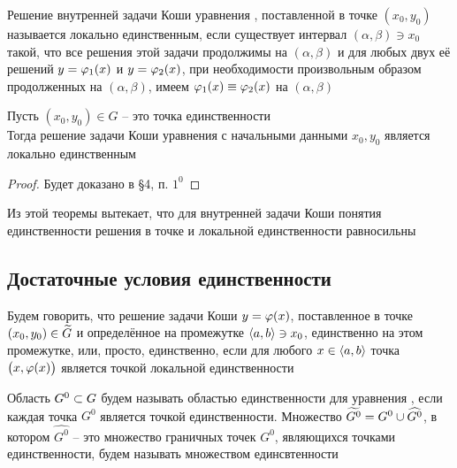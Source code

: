 \begin{definition}\label{def:uniq:local}
    Решение внутренней задачи Коши уравнения , поставленной в точке $ (x_0, y_0) $ называется локально единственным, если существует интервал $ (\alpha, \beta) \ni x_0 $ такой, что все решения этой задачи продолжимы на $ (\alpha, \beta) $ и для любых двух её решений $ y = \varphi_1(x) $ и $ y = \varphi_2(x) $, при необходимости произвольным образом продолженных на $ (\alpha, \beta) $, имеем $ \vphi_1(x) \equiv \vphi_2(x) $ на $ (\alpha, \beta) $
\end{definition}

\begin{theorem}\label{th:uniq-and-local-uniq}
	Пусть $ (x_0, y_0) \in G $ -- это точка единственности \\
    Тогда решение задачи Коши уравнения  с начальными данными $ x_0, y_0 $ является локально единственным
\end{theorem}

\begin{proof}
	Будет доказано в \S4, п. $ 1^0 $
\end{proof}

\begin{implication}
	Из этой теоремы вытекает, что для внутренней задачи Коши понятия единственности решения в точке и локальной единственности равносильны
\end{implication}

\subsection{Достаточные условия единственности}

\begin{definition}
    Будем говорить, что решение задачи Коши $ y = \varphi(x) $, поставленное в точке $ (x_0, y_0) \in \widetilde{G} $ и определённое на промежутке $ \Braket{a, b} \ni x_0 $, единственно на этом промежутке, или, просто, единственно, если для любого $ x \in \Braket{a, b} $ точка $ \big( x, \varphi(x) \big) $ является точкой локальной единственности
\end{definition}

\begin{definition}
    Область $ G^0 \subset G $ будем называть областью единственности для уравнения , если каждая точка $ G^0 $ является точкой единственности. Множество $ \widetilde{G^0} = G^0 \cup \widehat{G^0} $, в котором $ \hat{G^0} $ -- это множество граничных точек $ G^0 $, являющихся точками единственности, будем называть множеством единсвтенности
\end{definition}

